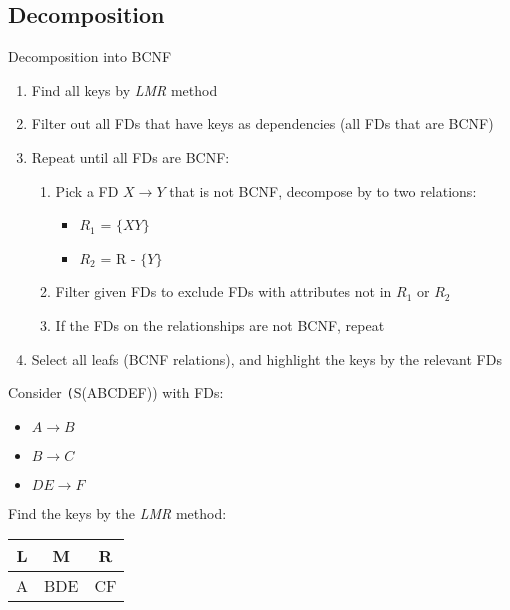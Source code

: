\subsection{Decomposition}

\begin{theorem}
    {Decomposition into BCNF}

    \begin{enumerate}
        \item Find all keys by \textit{LMR} method
        \item Filter out all FDs that have keys as dependencies (all FDs that are BCNF)
        \item Repeat until all FDs are BCNF:
              \begin{enumerate}
                  \item Pick a FD $X \to Y$ that is not BCNF, decompose by to two relations:
                        \begin{itemize}
                            \item $R_1$ = $\{XY\}$
                            \item $R_2$ = R - $\{Y\}$
                        \end{itemize}
                  \item Filter given FDs to exclude FDs with attributes not in $R_1$ or $R_2$
                  \item If the FDs on the relationships are not BCNF, repeat
              \end{enumerate}
        \item Select all leafs (BCNF relations), and highlight the keys by the relevant FDs
    \end{enumerate}

    \tcblower

    Consider \texttt(S(ABCDEF)) with FDs:
    \begin{itemize}
        \item $A \to B$
        \item $B \to C$
        \item $DE \to F$
    \end{itemize}
    Find the keys by the \textit{LMR} method:
    \begin{tabular}{c|c|c}
        L & M   & R  \\
        \hline
        A & BDE & CF \\
    \end{tabular}


\end{theorem}
